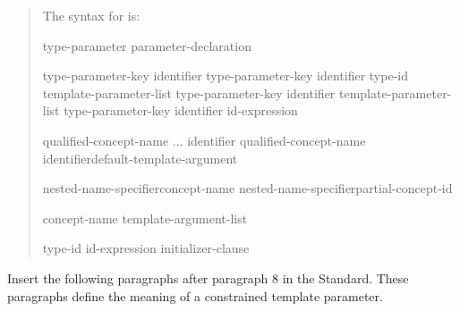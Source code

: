 \begin{quote}
\pnum
The syntax for  is:

\begin{bnf}
\br
  type-parameter\br
  parameter-declaration\br
\end{bnf}

\begin{bnf}
\br
  type-parameter-key \opt identifier\opt\br
  type-parameter-key identifier\opt{} \terminal{=} type-id\br
   template-parameter-list \terminal{>} type-parameter-key \opt identifier\opt\br
   template-parameter-list \terminal{>} type-parameter-key identifier\opt{} \terminal{=} id-expression
\end{bnf}

\begin{bnf}
\br
  \br
\end{bnf}

\begin{bnf}
\begin{addedblock}
\br
  qualified-concept-name ... identifier\opt\br
  qualified-concept-name identifier\opt default-template-argument\opt

\br
	nested-name-specifier\opt concept-name\br
	nested-name-specifier\opt partial-concept-id

\br
		concept-name \terminal{<} template-argument-list\opt \terminal{>}

\br
  \terminal{=} type-id\br
  \terminal{=} id-expression\br
  \terminal{=} initializer-clause
\end{addedblock}
\end{bnf}
\end{quote}

Insert the following paragraphs after paragraph 8 in the \Cpp Standard. These 
paragraphs define the meaning of a constrained template parameter.

